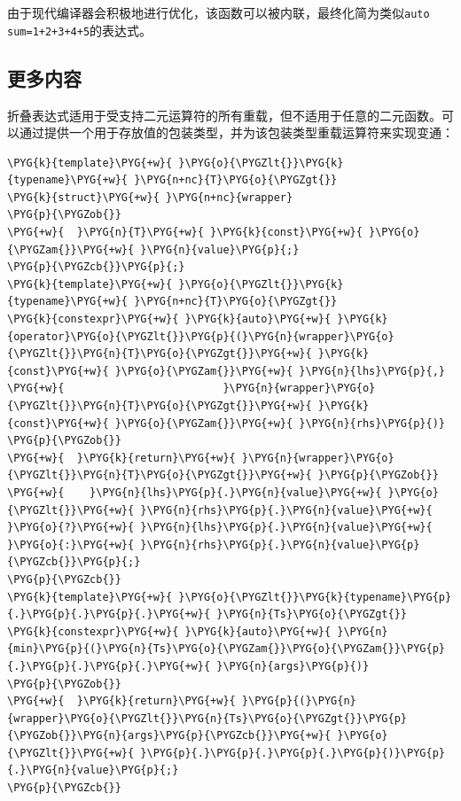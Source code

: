 \begin{myNote}[tip]
由于现代编译器会积极地进行优化，该函数可以被内联，最终化简为类似\texttt{auto sum=1+2+3+4+5}的表达式。
\end{myNote}



\subsection{更多内容}



折叠表达式适用于受支持二元运算符的所有重载，但不适用于任意的二元函数。可以通过提供一个用于存放值的包装类型，并为该包装类型重载运算符来实现变通：



\begin{codeblockbg}
\begin{Verbatim}[commandchars=\\\{\},breaklines=true,breakanywhere=true,fontsize=\codefont,xleftmargin=17bp]
\PYG{k}{template}\PYG{+w}{ }\PYG{o}{\PYGZlt{}}\PYG{k}{typename}\PYG{+w}{ }\PYG{n+nc}{T}\PYG{o}{\PYGZgt{}}
\PYG{k}{struct}\PYG{+w}{ }\PYG{n+nc}{wrapper}
\PYG{p}{\PYGZob{}}
\PYG{+w}{  }\PYG{n}{T}\PYG{+w}{ }\PYG{k}{const}\PYG{+w}{ }\PYG{o}{\PYGZam{}}\PYG{+w}{ }\PYG{n}{value}\PYG{p}{;}
\PYG{p}{\PYGZcb{}}\PYG{p}{;}
\PYG{k}{template}\PYG{+w}{ }\PYG{o}{\PYGZlt{}}\PYG{k}{typename}\PYG{+w}{ }\PYG{n+nc}{T}\PYG{o}{\PYGZgt{}}
\PYG{k}{constexpr}\PYG{+w}{ }\PYG{k}{auto}\PYG{+w}{ }\PYG{k}{operator}\PYG{o}{\PYGZlt{}}\PYG{p}{(}\PYG{n}{wrapper}\PYG{o}{\PYGZlt{}}\PYG{n}{T}\PYG{o}{\PYGZgt{}}\PYG{+w}{ }\PYG{k}{const}\PYG{+w}{ }\PYG{o}{\PYGZam{}}\PYG{+w}{ }\PYG{n}{lhs}\PYG{p}{,}
\PYG{+w}{                         }\PYG{n}{wrapper}\PYG{o}{\PYGZlt{}}\PYG{n}{T}\PYG{o}{\PYGZgt{}}\PYG{+w}{ }\PYG{k}{const}\PYG{+w}{ }\PYG{o}{\PYGZam{}}\PYG{+w}{ }\PYG{n}{rhs}\PYG{p}{)}
\PYG{p}{\PYGZob{}}
\PYG{+w}{  }\PYG{k}{return}\PYG{+w}{ }\PYG{n}{wrapper}\PYG{o}{\PYGZlt{}}\PYG{n}{T}\PYG{o}{\PYGZgt{}}\PYG{+w}{ }\PYG{p}{\PYGZob{}}
\PYG{+w}{    }\PYG{n}{lhs}\PYG{p}{.}\PYG{n}{value}\PYG{+w}{ }\PYG{o}{\PYGZlt{}}\PYG{+w}{ }\PYG{n}{rhs}\PYG{p}{.}\PYG{n}{value}\PYG{+w}{ }\PYG{o}{?}\PYG{+w}{ }\PYG{n}{lhs}\PYG{p}{.}\PYG{n}{value}\PYG{+w}{ }\PYG{o}{:}\PYG{+w}{ }\PYG{n}{rhs}\PYG{p}{.}\PYG{n}{value}\PYG{p}{\PYGZcb{}}\PYG{p}{;}
\PYG{p}{\PYGZcb{}}
\PYG{k}{template}\PYG{+w}{ }\PYG{o}{\PYGZlt{}}\PYG{k}{typename}\PYG{p}{.}\PYG{p}{.}\PYG{p}{.}\PYG{+w}{ }\PYG{n}{Ts}\PYG{o}{\PYGZgt{}}
\PYG{k}{constexpr}\PYG{+w}{ }\PYG{k}{auto}\PYG{+w}{ }\PYG{n}{min}\PYG{p}{(}\PYG{n}{Ts}\PYG{o}{\PYGZam{}}\PYG{o}{\PYGZam{}}\PYG{p}{.}\PYG{p}{.}\PYG{p}{.}\PYG{+w}{ }\PYG{n}{args}\PYG{p}{)}
\PYG{p}{\PYGZob{}}
\PYG{+w}{  }\PYG{k}{return}\PYG{+w}{ }\PYG{p}{(}\PYG{n}{wrapper}\PYG{o}{\PYGZlt{}}\PYG{n}{Ts}\PYG{o}{\PYGZgt{}}\PYG{p}{\PYGZob{}}\PYG{n}{args}\PYG{p}{\PYGZcb{}}\PYG{+w}{ }\PYG{o}{\PYGZlt{}}\PYG{+w}{ }\PYG{p}{.}\PYG{p}{.}\PYG{p}{.}\PYG{p}{)}\PYG{p}{.}\PYG{n}{value}\PYG{p}{;}
\PYG{p}{\PYGZcb{}}
\end{Verbatim}
\end{codeblockbg}


